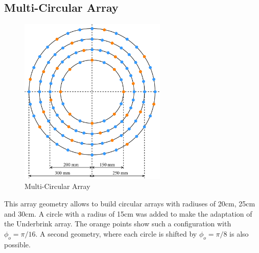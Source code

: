 \subsection{Multi-Circular Array}
\begin{minipage}{\linewidth}
	\begin{figure}
		\vspace{-0.8cm}
		\includegraphics[width=7cm]{images/5_array_evaluation/prototype_array_multi_circular.pdf}
		\centering
		\caption{Multi-Circular Array}
		\label{fig:prototype_array_multi_circular}
	\end{figure}
	This array geometry allows to build circular arrays with radiuses of 20cm, 25cm and
	30cm.
	A circle with a radius of 15cm was added to make the adaptation of the Underbrink array. 
	The orange points show such a configuration with $\phi_o = \pi/16$.
	A second geometry, where each circle is shifted by $\phi_o = \pi / 8$ is also possible.
\end{minipage}
\vspace{5.5cm}    %

